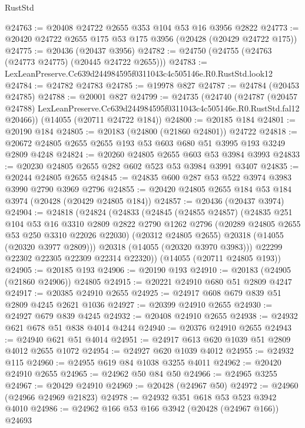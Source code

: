 \begin{lexlean}{RustStd}
\begin{coremodule}
@24763 := @20408 @24722 @2655 @353 @104 @53 @16 @3956 @2822
@24773 := @20420 @24722 @2655 @175 @53 @175 @3956 (@20428 (@20429 @24722 @175))
@24775 := @20436 (@20437 @3956)
@24782 := @24750 (@24755 (@24763 (@24773 @24775) (@20445 @24722 @2655)))
@24783 := LexLeanPreserve.Cc639d244984595f0311043c4c505146e.R0.RustStd.look12
@24784 := @24782 @24783
@24785 := @19978 @827
@24787 := @24784 (@20453 @24785)
@24788 := @20001 @827
@24799 := @24735
    (@24740
      (@24787
        (@20457 @24788)
        LexLeanPreserve.Cc639d244984595f0311043c4c505146e.R0.RustStd.fal12
        @20466))
    (@14055 (@20711 @24722 @184))
@24800 := @20185 @184
@24801 := @20190 @184
@24805 := @20183 (@24800 (@21860 @24801)) @24722
@24818 := @20672 @24805 @2655 @2655 @193 @53 @603 @680 @51 @3995 @193 @3249 @2809 @4248
@24824 := @20260 @24805 @2655 @603 @53 @3984 @3993
@24833 := @20230 @24805 @2655 @282 @602 @523 @53 @3984 @3991 @3407
@24835 := @20244 @24805 @2655
@24845 := @24835 @600 @287 @53 @522 @3974 @3983 @3990 @2790 @3969 @2796
@24855 := @20420 @24805 @2655 @184 @53 @184 @3974 (@20428 (@20429 @24805 @184))
@24857 := @20436 (@20437 @3974)
@24904 := @24818
    (@24824
      (@24833
        (@24845
          (@24855 @24857)
          (@24835
            @251
            @104
            @53
            @16
            @3310
            @2809
            @2822
            @2790
            @1262
            @2796
            (@20289 @24805 @2655 @53 @250 @3310 @22026 @22030)
            (@20312 @24805 @2655)
            @20318
            (@14055 (@20320 @3977 @2809)))
          @20318
          (@14055 (@20320 @3970 @3983)))
        @22299
        @22302
        @22305
        @22309
        @22314
        @22320))
    (@14055 (@20711 @24805 @193))
@24905 := @20185 @193
@24906 := @20190 @193
@24910 := @20183 (@24905 (@21860 @24906)) @24805
@24915 := @20221 @24910 @680 @51 @2809 @4247
@24917 := @20385 @24910 @2655
@24925 := @24917 @608 @679 @839 @51 @2809 @4245 @2621 @1036
@24927 := @20399 @24910 @2655
@24930 := @24927 @679 @839 @4245
@24932 := @20408 @24910 @2655
@24938 := @24932 @621 @678 @51 @838 @4014 @4244
@24940 := @20376 @24910 @2655
@24943 := @24940 @621 @51 @4014
@24951 := @24917 @613 @620 @1039 @51 @2809 @4012 @2655 @1072
@24954 := @24927 @620 @1039 @4012
@24955 := @24932 @115
@24960 := @24955 @619 @84 @1038 @3255 @4011
@24962 := @20420 @24910 @2655
@24965 := @24962 @50 @84 @50
@24966 := @24965 @3255
@24967 := @20429 @24910
@24969 := @20428 (@24967 @50)
@24972 := @24960 (@24966 @24969 @21823)
@24978 := @24932 @351 @618 @53 @523 @3942 @4010
@24986 := @24962 @166 @53 @166 @3942 (@20428 (@24967 @166)) @24693

\end{coremodule}
\end{lexlean}
